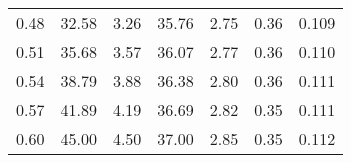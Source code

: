 \begin{tabular}{@{}ccccccc@{}}
0.48 & 32.58                                                                          & 3.26                                                          & 35.76                                                                     & 2.75                                                                        & 0.36                                                                       & 0.109                                                                   \\
0.51 & 35.68                                                                          & 3.57                                                          & 36.07                                                                     & 2.77                                                                        & 0.36                                                                       & 0.110                                                                   \\
0.54 & 38.79                                                                          & 3.88                                                          & 36.38                                                                     & 2.80                                                                        & 0.36                                                                       & 0.111                                                                   \\
0.57 & 41.89                                                                          & 4.19                                                          & 36.69                                                                     & 2.82                                                                        & 0.35                                                                       & 0.111                                                                   \\
0.60 & 45.00                                                                          & 4.50                                                          & 37.00                                                                     & 2.85                                                                        & 0.35                                                                       & 0.112                                                                   \\ \bottomrule
\end{tabular}
